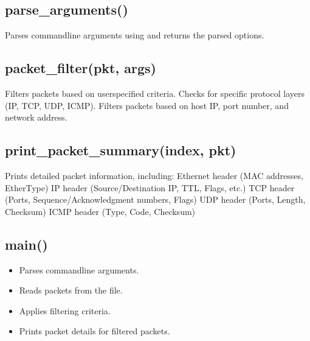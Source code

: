 \documentclass[letterpaper,10pt,english]{sphinxmanual}
\begin{document}
\subsection{parse\_arguments()}
\label{\detokenize{packet_sniffer_doc:parse-arguments}}
\sphinxAtStartPar
Parses command\sphinxhyphen{}line arguments using  and returns the parsed options.


\subsection{packet\_filter(pkt, args)}
\label{\detokenize{packet_sniffer_doc:packet-filter-pkt-args}}
\sphinxAtStartPar
Filters packets based on user\sphinxhyphen{}specified criteria.
\sphinxhyphen{} Checks for specific protocol layers (IP, TCP, UDP, ICMP).
\sphinxhyphen{} Filters packets based on host IP, port number, and network address.


\subsection{print\_packet\_summary(index, pkt)}
\label{\detokenize{packet_sniffer_doc:print-packet-summary-index-pkt}}
\sphinxAtStartPar
Prints detailed packet information, including:
\sphinxhyphen{} Ethernet header (MAC addresses, EtherType)
\sphinxhyphen{} IP header (Source/Destination IP, TTL, Flags, etc.)
\sphinxhyphen{} TCP header (Ports, Sequence/Acknowledgment numbers, Flags)
\sphinxhyphen{} UDP header (Ports, Length, Checksum)
\sphinxhyphen{} ICMP header (Type, Code, Checksum)


\subsection{main()}
\label{\detokenize{packet_sniffer_doc:main}}\begin{itemize}
\item {} 
\sphinxAtStartPar
Parses command\sphinxhyphen{}line arguments.

\item {} 
\sphinxAtStartPar
Reads packets from the  file.

\item {} 
\sphinxAtStartPar
Applies filtering criteria.

\item {} 
\sphinxAtStartPar
Prints packet details for filtered packets.

\end{itemize}
\end{document}
